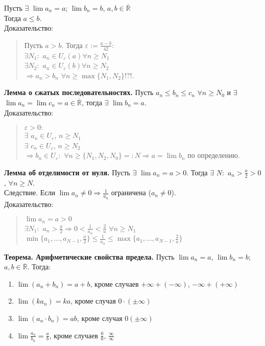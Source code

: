 \documentclass{article}
\begin{document}
	Пусть $\exists$ $\lim a_n = a$; $\lim b_n = b$, $a, b \in \overline{\mathbb{R}}$ \\
	Тогда $a \leqslant b$. \\
	Доказательство:
	\begin{quote}
		Пусть $a > b$. Тогда $\varepsilon := \frac{a - b}{42}:$ \\
		$\exists N_1:$ $a_n \in U_{\varepsilon} (a) \forall n \geqslant N_1$ \\
		$\exists N_2:$ $a_n \in U_{\varepsilon} (b) \forall n \geqslant N_2$ \\
		$\Rightarrow a_n > b_n$ $\forall n \geqslant \max\{N_1, N_2\} !?!$.
	\end{quote}
	\textbf{Лемма о сжатых последовательностях.} Пусть $a_n \leqslant b_n \leqslant c_n$ $\forall n \geqslant N_0$ и $\exists$ $\lim a_n = \lim c_n = a \in \overline{\mathbb{R}}$, тогда $\exists$ $\lim b_n = a$. \\
	Доказательство:
	\begin{quote}
		$\varepsilon > 0:$ \\
		$\exists$ $a_n \in U_{\varepsilon}$, $n \geqslant N_1$ \\
		$\exists$ $c_n \in U_{\varepsilon}$, $n \geqslant N_2$ \\
		$\Rightarrow b_n \in U_{\varepsilon}:$ $\forall n \geqslant \{N_1, N_2, N_0\} =: N \Rightarrow a = \lim b_n$ по определению.
	\end{quote}
	\textbf{Лемма об отделимости от нуля.} Пусть $\exists$ $\lim a_n = a > 0$. Тогда $\exists$ $N:$ $a_n > \frac{a}{2} > 0$, $\forall n \geqslant N$. \\
	Следствие. Если $\lim a_n \not= 0 \Rightarrow \frac{1}{a_n}$ ограничена ($a_n \not= 0$). \\
	Доказательство:
	\begin{quote}
		$\lim a_n = a > 0$ \\
		$\exists N_1:$ $a_n > \frac{a}{2} \Rightarrow 0 < \frac{1}{a_n} < \frac{2}{a}$ $\forall n \geqslant N_1$ \\
		$\min\{a_1, \dots, a_{N - 1}, \frac{a}{2}\} \leqslant \frac{1}{a_n} \leqslant \max\{a_1, \dots, a_{N - 1}, \frac{2}{a}\}$
	\end{quote}
	\textbf{Теорема. Арифметические свойства предела.} Пусть $\lim a_n = a$, $\lim b_n = b$; $a, b \in \overline{\mathbb{R}}$. Тогда:
	\begin{enumerate}
		\item $\lim (a_n + b_n) = a + b$, кроме случаев $+ \infty + (- \infty)$, $- \infty + (+ \infty)$
		\item $\lim (ka_n) = ka$, кроме случая $0 \cdot (\pm \infty)$
		\item $\lim (a_n \cdot b_n) = ab$, кроме случая $0 (\pm \infty)$
		\item $\lim \frac{a_n}{b_n} = \frac{a}{b}$, кроме случаев $\frac{0}{0}$, $\frac{\infty}{\infty}$
	\end{enumerate}
\end{document}
